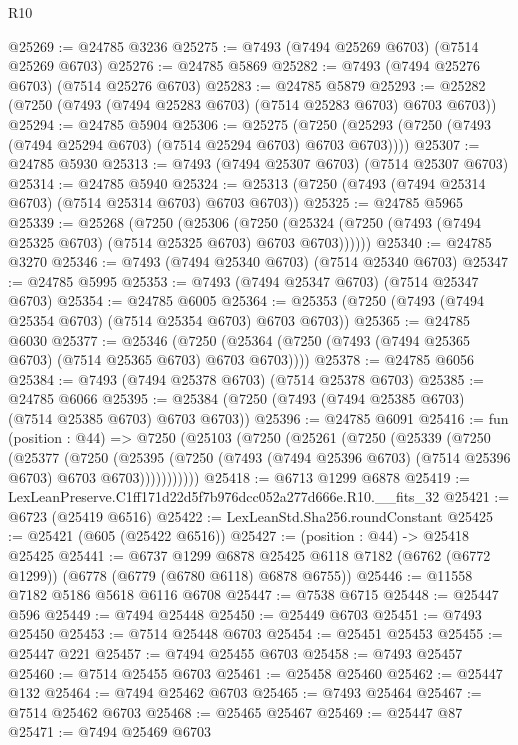 \begin{lexlean}{R10}
\begin{coremodule}
@25269 := @24785 @3236
@25275 := @7493 (@7494 @25269 @6703) (@7514 @25269 @6703)
@25276 := @24785 @5869
@25282 := @7493 (@7494 @25276 @6703) (@7514 @25276 @6703)
@25283 := @24785 @5879
@25293 := @25282 (@7250 (@7493 (@7494 @25283 @6703) (@7514 @25283 @6703) @6703 @6703))
@25294 := @24785 @5904
@25306 := @25275
    (@7250 (@25293 (@7250 (@7493 (@7494 @25294 @6703) (@7514 @25294 @6703) @6703 @6703))))
@25307 := @24785 @5930
@25313 := @7493 (@7494 @25307 @6703) (@7514 @25307 @6703)
@25314 := @24785 @5940
@25324 := @25313 (@7250 (@7493 (@7494 @25314 @6703) (@7514 @25314 @6703) @6703 @6703))
@25325 := @24785 @5965
@25339 := @25268
    (@7250
      (@25306
        (@7250 (@25324 (@7250 (@7493 (@7494 @25325 @6703) (@7514 @25325 @6703) @6703 @6703))))))
@25340 := @24785 @3270
@25346 := @7493 (@7494 @25340 @6703) (@7514 @25340 @6703)
@25347 := @24785 @5995
@25353 := @7493 (@7494 @25347 @6703) (@7514 @25347 @6703)
@25354 := @24785 @6005
@25364 := @25353 (@7250 (@7493 (@7494 @25354 @6703) (@7514 @25354 @6703) @6703 @6703))
@25365 := @24785 @6030
@25377 := @25346
    (@7250 (@25364 (@7250 (@7493 (@7494 @25365 @6703) (@7514 @25365 @6703) @6703 @6703))))
@25378 := @24785 @6056
@25384 := @7493 (@7494 @25378 @6703) (@7514 @25378 @6703)
@25385 := @24785 @6066
@25395 := @25384 (@7250 (@7493 (@7494 @25385 @6703) (@7514 @25385 @6703) @6703 @6703))
@25396 := @24785 @6091
@25416 := fun (position : @44) =>
  @7250
    (@25103
      (@7250
        (@25261
          (@7250
            (@25339
              (@7250
                (@25377
                  (@7250
                    (@25395
                      (@7250 (@7493 (@7494 @25396 @6703) (@7514 @25396 @6703) @6703 @6703)))))))))))
@25418 := @6713 @1299 @6878
@25419 := LexLeanPreserve.C1ff171d22d5f7b976dcc052a277d666e.R10.__fits_32
@25421 := @6723 (@25419 @6516)
@25422 := LexLeanStd.Sha256.roundConstant
@25425 := @25421 (@605 (@25422 @6516))
@25427 := (position : @44) -> @25418 @25425
@25441 := @6737
    @1299
    @6878
    @25425
    @6118
    @7182
    (@6762 (@6772 @1299))
    (@6778 (@6779 (@6780 @6118) @6878 @6755))
@25446 := @11558 @7182 @5186 @5618 @6116 @6708
@25447 := @7538 @6715
@25448 := @25447 @596
@25449 := @7494 @25448
@25450 := @25449 @6703
@25451 := @7493 @25450
@25453 := @7514 @25448 @6703
@25454 := @25451 @25453
@25455 := @25447 @221
@25457 := @7494 @25455 @6703
@25458 := @7493 @25457
@25460 := @7514 @25455 @6703
@25461 := @25458 @25460
@25462 := @25447 @132
@25464 := @7494 @25462 @6703
@25465 := @7493 @25464
@25467 := @7514 @25462 @6703
@25468 := @25465 @25467
@25469 := @25447 @87
@25471 := @7494 @25469 @6703

\end{coremodule}
\end{lexlean}
